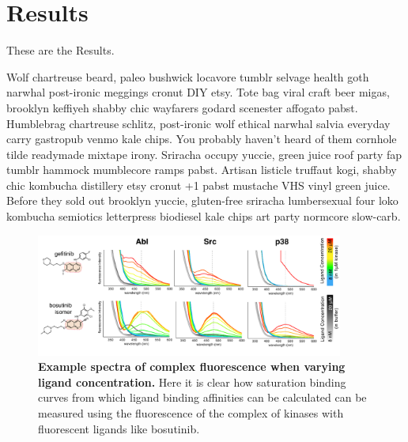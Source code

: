 \documentclass[aps,pre,twocolumn,nofootinbib,superscriptaddress,linenumbers,11point]{revtex4-1}
\begin{document}
\section{Results}

These are the Results.

Wolf chartreuse beard, paleo bushwick locavore tumblr selvage health goth narwhal post-ironic meggings cronut DIY etsy. 
Tote bag viral craft beer migas, brooklyn keffiyeh shabby chic wayfarers godard scenester affogato pabst. 
Humblebrag chartreuse schlitz, post-ironic wolf ethical narwhal salvia everyday carry gastropub venmo kale chips. You probably haven't heard of them cornhole tilde readymade mixtape irony. 
Sriracha occupy yuccie, green juice roof party fap tumblr hammock mumblecore ramps pabst. Artisan listicle truffaut kogi, shabby chic kombucha distillery etsy cronut +1 pabst mustache VHS vinyl green juice. 
Before they sold out brooklyn yuccie, gluten-free sriracha lumbersexual four loko kombucha semiotics letterpress biodiesel kale chips art party normcore slow-carb.


\begin{figure}[t]
\includegraphics[width=0.9\textwidth]{SpectraAssay-v3.pdf}
\caption{\label{figure:example} {\bf Example spectra of complex fluorescence when varying ligand concentration.} 
Here it is clear how saturation binding curves from which ligand binding affinities can be calculated can be measured using the fluorescence of the complex of kinases with fluorescent ligands like bosutinib.
}
\end{figure}

\end{document}
